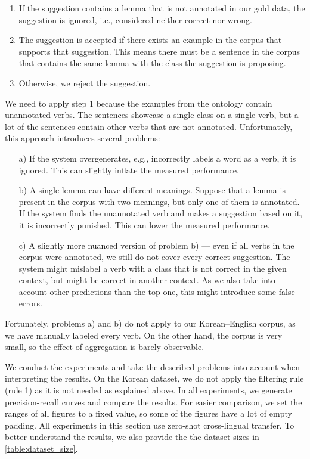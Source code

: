 \begin{enumerate}
    \itemsep0em
    \item If the suggestion contains a lemma that is not annotated in our gold data, the suggestion is ignored, i.e., considered neither correct nor wrong.
    \item The suggestion is accepted if there exists an example in the corpus that supports that suggestion. This means there must be a sentence in the corpus that contains the same lemma with the class the suggestion is proposing.
    \item Otherwise, we reject the suggestion.
\end{enumerate}

We need to apply step 1 because the examples from the ontology contain unannotated verbs. The sentences showcase a single class on a single verb, but a lot of the sentences contain other verbs that are not annotated. Unfortunately, this approach introduces several problems:

\begin{enumerate}
    \itemsep0em
    \item[a)] If the system overgenerates, e.g., incorrectly labels a word as a verb, it is ignored. This can slightly inflate the measured performance.
    \item[b)] A single lemma can have different meanings. Suppose that a lemma is present in the corpus with two meanings, but only one of them is annotated. If the system finds the unannotated verb and makes a suggestion based on it, it is incorrectly punished. This can lower the measured performance.
    \item[c)] A slightly more nuanced version of problem b) --- even if all verbs in the corpus were annotated, we still do not cover every correct suggestion. The system might mislabel a verb with a class that is not correct in the given context, but might be correct in another context. As we also take into account other predictions than the top one, this might introduce some false errors.
\end{enumerate}

Fortunately, problems a) and b) do not apply to our Korean--English corpus, as we have manually labeled every verb. On the other hand, the corpus is very small, so the effect of aggregation is barely observable.

We conduct the experiments and take the described problems into account when interpreting the results. On the Korean dataset, we do not apply the filtering rule (rule 1) as it is not needed as explained above. In all experiments, we generate precision-recall curves and compare the results. For easier comparison, we set the ranges of all figures to a fixed value, so some of the figures have a lot of empty padding. All experiments in this section use zero-shot cross-lingual transfer. To better understand the results, we also provide the the dataset sizes in \cref{table:dataset_size}.


